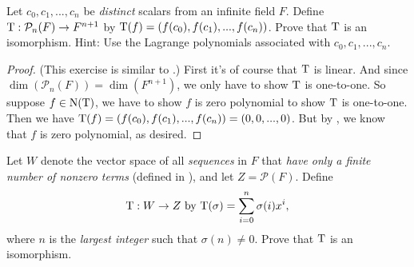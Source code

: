 \begin{exercise} \label{exercise 2.4.22}
Let \(c_0, c_1, ..., c_n\) be \emph{distinct} scalars from an infinite field \(F\).
Define \(\mathrm{T}: \mathcal{P}_n(F) \to F^{n + 1}\) by \(\mathrm{T}(f) = (f(c_0), f(c_1), ..., f(c_n))\).
Prove that \(\mathrm{T}\) is an isomorphism.
Hint: Use the Lagrange polynomials associated with \(c_0, c_1, ..., c_n\).
\end{exercise}

\begin{proof}
(This exercise is similar to .)
First it's of course that \(\mathrm{T}\) is linear.
And since \(\dim(\mathcal{P}_n(F)) = \dim(F^{n + 1})\), we only have to show \(\mathrm{T}\) is one-to-one.
So suppose \(f \in \mathrm{N(T)}\), we have to show \(f\) is zero polynomial to show \(\mathrm{T}\) is one-to-one.
Then we have \(\mathrm{T}(f) = (f(c_0), f(c_1), ..., f(c_n)) = (0, 0, ..., 0)\).
But by , we know that \(f\) is zero polynomial, as desired.
\end{proof}

\begin{exercise} \label{exercise 2.4.23}
Let \(W\) denote the vector space of all \emph{sequences} in \(F\) that \emph{have only a finite number of nonzero terms} (defined in ),
and let \(Z = \mathcal{P}(F)\).
Define
\[
    \mathrm{T} : W \to Z \text{ by } \mathrm{T}(\sigma) = \sum_{i = 0}^n \sigma(i)x^i,
\]
where \(n\) is the \emph{largest integer} such that \(\sigma(n) \ne 0\). Prove that \(\mathrm{T}\) is an isomorphism.
\end{exercise}

